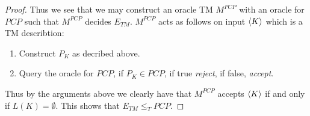 \documentclass[a4paper,11pt]{article}
\numberwithin{equation}{section}
\begin{document}
\begin{proof}
Thus we see that we may construct an oracle TM $ M^{PCP} $ with an oracle for $ PCP $ such that $ M^{PCP} $ decides $ E_{TM} $. $ M^{PCP} $ acts as follows on input $ \braket{K} $ which is a TM describtion:\begin{enumerate}
	\item Construct $ P_K $ as decribed above.
	\item Query the oracle for $ PCP $, if $ P_K\in PCP $, if true \emph{reject}, if false, \emph{accept}.
\end{enumerate}
Thus by the arguments above we clearly have that $ M^{PCP} $ accepts $ \braket{K} $ if and only if $ L(K)=\emptyset $. This shows that $ E_{TM}\leq_T PCP $.
\end{proof}
\end{document}
